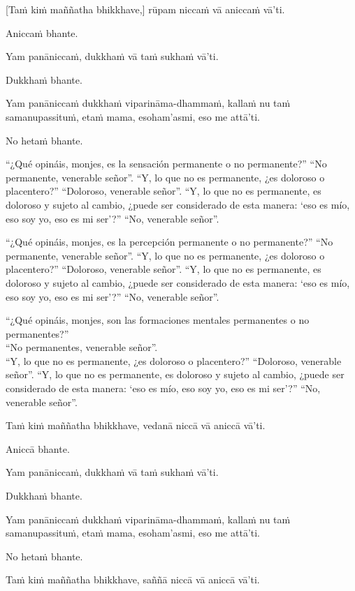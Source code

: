 [Taṁ kiṁ maññatha bhikkhave,] rūpam niccaṁ vā aniccaṁ vā'ti.

Aniccaṁ bhante.

Yam panāniccaṁ, dukkhaṁ vā taṁ sukhaṁ vā'ti.

Dukkhaṁ bhante.

Yam panāniccaṁ dukkhaṁ viparināma-dhammaṁ, kallaṁ nu taṁ samanupassituṁ,
etaṁ mama, esoham'asmi, eso me attā'ti.

No hetaṁ bhante.

\clearpage

\englishText
\markboth{\englishTitle}{\rightmark}
“¿Qué opináis, monjes, es la sensación permanente o no permanente?”
“No permanente, venerable señor”.
“Y, lo que no es permanente, ¿es doloroso o placentero?”
“Doloroso, venerable señor”.
“Y, lo que no es permanente, es doloroso y sujeto al cambio, ¿puede ser considerado de esta manera: ‘eso es mío, eso soy yo, eso es mi ser’?”
“No, venerable señor”.

“¿Qué opináis, monjes, es la percepción permanente o no permanente?”
“No permanente, venerable señor”.
“Y, lo que no es permanente, ¿es doloroso o placentero?”
“Doloroso, venerable señor”.
“Y, lo que no es permanente, es doloroso y sujeto al cambio, ¿puede ser considerado de esta manera: ‘eso es mío, eso soy yo, eso es mi ser’?”
“No, venerable señor”.

“¿Qué opináis, monjes, son las formaciones mentales permanentes o no permanentes?”\\
“No permanentes, venerable señor”.\\
“Y, lo que no es permanente, ¿es doloroso o placentero?”
“Doloroso, venerable señor”.
“Y, lo que no es permanente, es doloroso y sujeto al cambio, ¿puede ser considerado de esta manera: ‘eso es mío, eso soy yo, eso es mi ser’?”
“No, venerable señor”.



\clearpage

\paliText
\markboth{\paliTitle}{\rightmark}

Taṁ kiṁ maññatha bhikkhave, vedanā niccā vā aniccā vā'ti.

Aniccā bhante.

Yam panāniccaṁ, dukkhaṁ vā taṁ sukhaṁ vā'ti.

Dukkhaṁ bhante.

Yam panāniccaṁ dukkhaṁ viparināma-dhammaṁ, kallaṁ nu taṁ samanupassituṁ,
etaṁ mama, esoham'asmi, eso me attā'ti.

No hetaṁ bhante.

Taṁ kiṁ maññatha bhikkhave, saññā niccā vā aniccā vā'ti.

